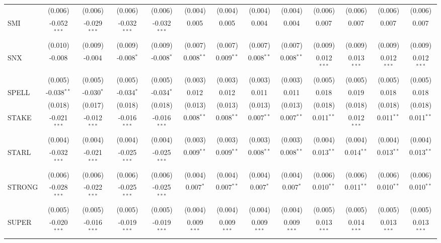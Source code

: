 \begin{table}[!htbp]
\begin{tabular}{@{\extracolsep{5pt}}lcccccccccccc}
  & (0.006) & (0.006) & (0.006) & (0.006) & (0.004) & (0.004) & (0.004) & (0.004) & (0.006) & (0.006) & (0.006) & (0.006) \\
 SMI & -0.052$^{***}$ & -0.029$^{***}$ & -0.032$^{***}$ & -0.032$^{***}$ & 0.005$^{}$ & 0.005$^{}$ & 0.004$^{}$ & 0.004$^{}$ & 0.007$^{}$ & 0.007$^{}$ & 0.007$^{}$ & 0.007$^{}$ \\
  & (0.010) & (0.009) & (0.009) & (0.009) & (0.007) & (0.007) & (0.007) & (0.007) & (0.009) & (0.009) & (0.009) & (0.009) \\
 SNX & -0.008$^{}$ & -0.004$^{}$ & -0.008$^{*}$ & -0.008$^{*}$ & 0.008$^{**}$ & 0.009$^{**}$ & 0.008$^{**}$ & 0.008$^{**}$ & 0.012$^{***}$ & 0.013$^{***}$ & 0.012$^{***}$ & 0.012$^{***}$ \\
  & (0.005) & (0.005) & (0.005) & (0.005) & (0.003) & (0.003) & (0.003) & (0.003) & (0.005) & (0.005) & (0.005) & (0.005) \\
 SPELL & -0.038$^{**}$ & -0.030$^{*}$ & -0.034$^{*}$ & -0.034$^{*}$ & 0.012$^{}$ & 0.012$^{}$ & 0.011$^{}$ & 0.011$^{}$ & 0.018$^{}$ & 0.019$^{}$ & 0.018$^{}$ & 0.018$^{}$ \\
  & (0.018) & (0.017) & (0.018) & (0.018) & (0.013) & (0.013) & (0.013) & (0.013) & (0.018) & (0.018) & (0.018) & (0.018) \\
 STAKE & -0.021$^{***}$ & -0.012$^{***}$ & -0.016$^{***}$ & -0.016$^{***}$ & 0.008$^{**}$ & 0.008$^{**}$ & 0.007$^{**}$ & 0.007$^{**}$ & 0.011$^{**}$ & 0.012$^{***}$ & 0.011$^{**}$ & 0.011$^{**}$ \\
  & (0.004) & (0.004) & (0.004) & (0.004) & (0.003) & (0.003) & (0.003) & (0.003) & (0.004) & (0.004) & (0.004) & (0.004) \\
 STARL & -0.032$^{***}$ & -0.021$^{***}$ & -0.025$^{***}$ & -0.025$^{***}$ & 0.009$^{**}$ & 0.009$^{**}$ & 0.008$^{**}$ & 0.008$^{**}$ & 0.013$^{**}$ & 0.014$^{**}$ & 0.013$^{**}$ & 0.013$^{**}$ \\
  & (0.006) & (0.006) & (0.006) & (0.006) & (0.004) & (0.004) & (0.004) & (0.004) & (0.006) & (0.006) & (0.006) & (0.006) \\
 STRONG & -0.028$^{***}$ & -0.022$^{***}$ & -0.025$^{***}$ & -0.025$^{***}$ & 0.007$^{*}$ & 0.007$^{**}$ & 0.007$^{*}$ & 0.007$^{*}$ & 0.010$^{**}$ & 0.011$^{**}$ & 0.010$^{**}$ & 0.010$^{**}$ \\
  & (0.005) & (0.005) & (0.005) & (0.005) & (0.004) & (0.004) & (0.004) & (0.004) & (0.005) & (0.005) & (0.005) & (0.005) \\
 SUPER & -0.020$^{***}$ & -0.016$^{***}$ & -0.019$^{***}$ & -0.019$^{***}$ & 0.009$^{***}$ & 0.009$^{***}$ & 0.009$^{***}$ & 0.009$^{***}$ & 0.013$^{***}$ & 0.014$^{***}$ & 0.013$^{***}$ & 0.013$^{***}$ \\

\end{tabular}
\end{table}
